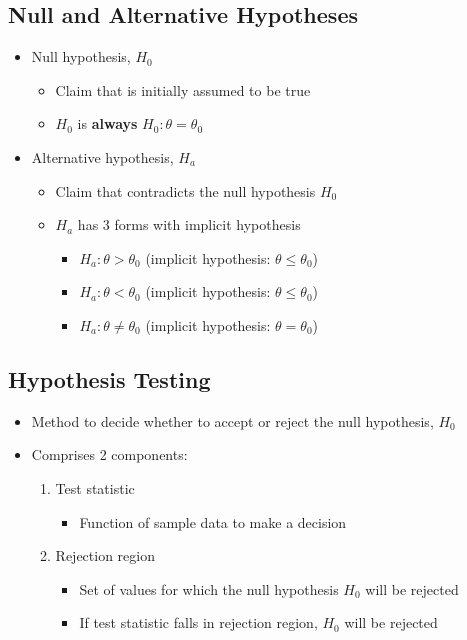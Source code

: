 \documentclass[a4paper]{article}
\begin{document}
\subsection{Null and Alternative Hypotheses}
\begin{itemize}
    \item Null hypothesis, $H_{0}$
    \begin{itemize}[label=$\circ$]
        \item Claim that is initially assumed to be true
        \item $H_{0}$ is \textbf{always} $H_{0}:\theta = \theta_{0}$
    \end{itemize}
    \item Alternative hypothesis, $H_{a}$
    \begin{itemize}[label=$\circ$]
        \item Claim that contradicts the null hypothesis $H_{0}$
        \item $H_{a}$ has 3 forms with implicit hypothesis
        \begin{itemize}[label=\tiny$\blacksquare$]
            \item $H_{a}: \theta>\theta_{0}$ (implicit hypothesis: $\theta \leq \theta_{0}$)
            \item $H_{a}: \theta<\theta_{0}$ (implicit hypothesis: $\theta \leq \theta_{0}$)
            \item $H_{a}:\theta \neq \theta_{0}$ (implicit hypothesis: $\theta = \theta_{0}$)
        \end{itemize}
    \end{itemize}
\end{itemize}
\subsection{Hypothesis Testing}
\begin{itemize}
    \item Method to decide whether to accept or reject the null hypothesis, $H_{0}$
    \item Comprises 2 components:
    \begin{enumerate}[label=$\circ$]
        \item Test statistic
        \begin{itemize}[label=\tiny$\blacksquare$]
            \item Function of sample data to make a decision
        \end{itemize}
        \item Rejection region
        \begin{itemize}[label=$\circ$]
            \item Set of values for which the null hypothesis $H_{0}$ will be rejected
            \item If test statistic falls in rejection region, $H_{0}$ will be rejected
        \end{itemize}
    \end{enumerate}
\end{itemize}
\end{document}
